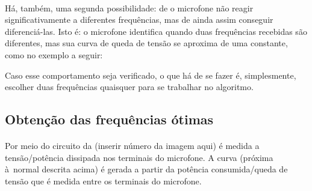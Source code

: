 \documentclass[11pt,a4paper]{report}
\begin{document}
	\paragraph{}
	
	\begin{center}
	\end{center}


Há, também, uma segunda possibilidade: de o microfone não reagir significativamente a diferentes frequências, mas de ainda assim conseguir diferenciá-las. Isto é: o microfone identifica quando duas frequências recebidas são diferentes, mas sua curva de queda de tensão se aproxima de uma constante, como no exemplo a seguir:


\begin{center}
\end{center}


	Caso esse comportamento seja verificado, o que há de se fazer é, simplesmente, escolher duas frequências quaisquer para se trabalhar no algoritmo.

\subsection{Obtenção das frequências ótimas}
\paragraph{}
Por meio do circuito da (inserir número da imagem aqui) é medida a tensão/potência dissipada nos terminais do microfone. A curva (próxima à normal descrita acima) é gerada a partir da potência consumida/queda de tensão que é medida entre os terminais do microfone.
\end{document}
